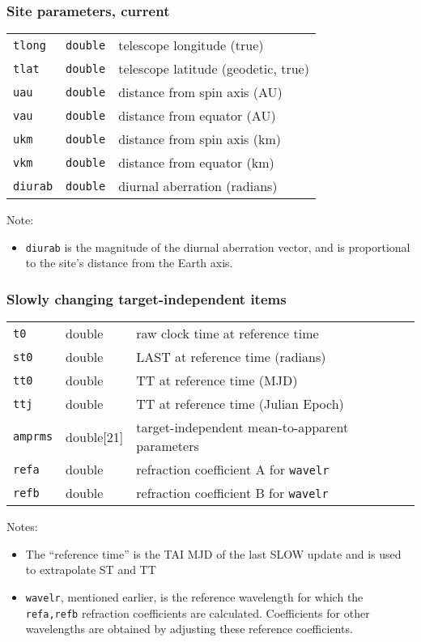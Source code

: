 \documentclass[12pt,fleqn,twoside]{article}
\renewcommand{\_}{{\tt\char'137}}     %
\newcommand{\notelist}  {\goodbreak \vspace{1ex} Notes:
                        \vspace{-3ex}}
\newcommand{\anotelist}  {\goodbreak \vspace{1ex} Note:
                        \vspace{-3ex}}
\begin{document}
\subsubsection{Site parameters, current}
\begin{tabular}{lll}
{\tt tlong} & {\tt double} & telescope longitude (true) \\
{\tt tlat} & {\tt double} & telescope latitude (geodetic, true) \\
{\tt uau} & {\tt double} & distance from spin axis (AU) \\
{\tt vau} & {\tt double} & distance from equator (AU) \\
{\tt ukm} & {\tt double} & distance from spin axis (km) \\
{\tt vkm} & {\tt double} & distance from equator (km) \\
{\tt diurab} & {\tt double} & diurnal aberration (radians) \\
\end{tabular}

\anotelist
\begin{itemize}
\item {\tt diurab} is the magnitude of the diurnal aberration vector, and
      is proportional to the site's distance from the Earth axis.
\end{itemize}

\subsubsection{Slowly changing target-independent items}
\begin{tabular}{lll}

{\tt t0} & {double} & raw clock time at reference time \\
{\tt st0} & {double} & LAST at reference time (radians) \\
{\tt tt0} & {double} & TT at reference time (MJD) \\
{\tt ttj} & {double} & TT at reference time (Julian Epoch) \\
{\tt amprms} & {double[21]} & target-independent mean-to-apparent parameters \\
{\tt refa} & {double} & refraction coefficient A for {\tt wavelr} \\
{\tt refb} & {double} & refraction coefficient B for {\tt wavelr} \\
\end{tabular}

\notelist
\begin{itemize}
\item The ``reference time'' is the TAI MJD of the last SLOW update
      and is used to extrapolate ST and TT

\item {\tt wavelr}, mentioned earlier, is the reference wavelength
      for
      which the {\tt refa,refb} refraction coefficients are calculated.
      Coefficients for other wavelengths are obtained by adjusting these
      reference coefficients.
\end{itemize}
\end{document}
